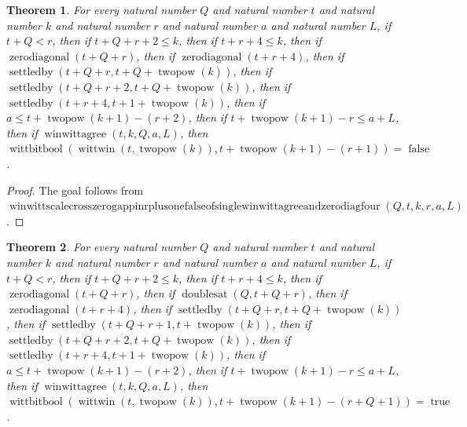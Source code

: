 \documentclass[11pt]{article}
\newtheorem{theorem}{Theorem}[section]
\theoremstyle{definition}
\begin{document}
\begin{theorem}
\label{ll:paper:winwitt-scale-cross-zero-gap-pin-r-plus-one-false-of-single-winwittagree-and-zero-diag-four}
For every natural number \(Q\) and natural number \(t\) and natural number \(k\) and natural number \(r\) and natural number \(a\) and natural number \(L\), if \(t + Q < r\), then if \(t + Q + r + 2 \le k\), then if \(t + r + 4 \le k\), then if \(\operatorname{zerodiagonal}(t + Q + r)\), then if \(\operatorname{zerodiagonal}(t + r + 4)\), then if \(\operatorname{settledby}(t + Q + r, t + Q + \operatorname{twopow}(k))\), then if \(\operatorname{settledby}(t + Q + r + 2, t + Q + \operatorname{twopow}(k))\), then if \(\operatorname{settledby}(t + r + 4, t + 1 + \operatorname{twopow}(k))\), then if \(a \le t + \operatorname{twopow}(k + 1) - (r + 2)\), then if \(t + \operatorname{twopow}(k + 1) - r \le a + L\), then if \(\operatorname{winwittagree}(t, k, Q, a, L)\), then \(\operatorname{wittbitbool}(\operatorname{wittwin}(t, \operatorname{twopow}(k)), t + \operatorname{twopow}(k + 1) - (r + 1)) = \operatorname{false}\).
\end{theorem}
\begin{proof}
The goal follows from \(\operatorname{winwittscalecrosszerogappinrplusonefalseofsinglewinwittagreeandzerodiagfour}(Q, t, k, r, a, L)\).
\end{proof}
\begin{theorem}
\label{ll:paper:winwitt-scale-cross-zero-gap-pin-doubling-diag-true-of-doubles-and-single-winwittagree-and-zero-diag-four}
For every natural number \(Q\) and natural number \(t\) and natural number \(k\) and natural number \(r\) and natural number \(a\) and natural number \(L\), if \(t + Q < r\), then if \(t + Q + r + 2 \le k\), then if \(t + r + 4 \le k\), then if \(\operatorname{zerodiagonal}(t + Q + r)\), then if \(\operatorname{doublesat}(Q, t + Q + r)\), then if \(\operatorname{zerodiagonal}(t + r + 4)\), then if \(\operatorname{settledby}(t + Q + r, t + Q + \operatorname{twopow}(k))\), then if \(\operatorname{settledby}(t + Q + r + 1, t + \operatorname{twopow}(k))\), then if \(\operatorname{settledby}(t + Q + r + 2, t + Q + \operatorname{twopow}(k))\), then if \(\operatorname{settledby}(t + r + 4, t + 1 + \operatorname{twopow}(k))\), then if \(a \le t + \operatorname{twopow}(k + 1) - (r + 2)\), then if \(t + \operatorname{twopow}(k + 1) - r \le a + L\), then if \(\operatorname{winwittagree}(t, k, Q, a, L)\), then \(\operatorname{wittbitbool}(\operatorname{wittwin}(t, \operatorname{twopow}(k)), t + \operatorname{twopow}(k + 1) - (r + Q + 1)) = \operatorname{true}\).
\end{theorem}
\end{document}
